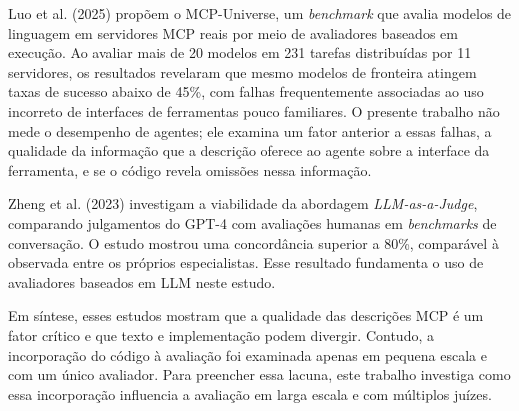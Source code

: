 Luo et al. (2025)\nocite{2025arXiv250814704L} propõem o MCP-Universe, um \textit{benchmark} que avalia modelos de linguagem em servidores MCP reais por meio de avaliadores baseados em execução. Ao avaliar mais de 20 modelos em 231 tarefas distribuídas por 11 servidores, os resultados revelaram que mesmo modelos de fronteira atingem taxas de sucesso abaixo de 45\%, com falhas frequentemente associadas ao uso incorreto de interfaces de ferramentas pouco familiares. O presente trabalho não mede o desempenho de agentes; ele examina um fator anterior a essas falhas, a qualidade da informação que a descrição oferece ao agente sobre a interface da ferramenta, e se o código revela omissões nessa informação.

Zheng et al. (2023) \nocite{NEURIPS2023_91f18a12} investigam a viabilidade da abordagem \textit{LLM-as-a-Judge}, comparando julgamentos do GPT-4 com avaliações humanas em \textit{benchmarks} de conversação. O estudo mostrou uma concordância superior a 80\%, comparável à observada entre os próprios especialistas. Esse resultado fundamenta o uso de avaliadores baseados em LLM neste estudo.

Em síntese, esses estudos mostram que a qualidade das descrições MCP é um fator crítico e que texto e implementação podem divergir. Contudo, a incorporação do código à avaliação foi examinada apenas em pequena escala e com um único avaliador. Para preencher essa lacuna, este trabalho investiga como essa incorporação influencia a avaliação em larga escala e com múltiplos juízes.